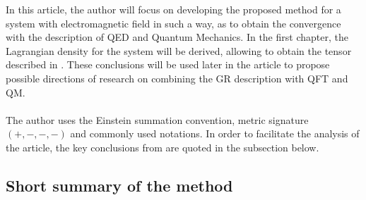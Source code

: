 \documentclass[aps,prx,preprint,groupedaddress,showkeys]{revtex4-2}
\begin{document}
In this article, the author will focus on developing the proposed method for a system with electromagnetic field in such a way, as to obtain the convergence with the description of QED and Quantum Mechanics. In the first chapter, the Lagrangian density for the system will be derived, allowing to obtain the tensor described in \cite{PMofC}. These conclusions will be used later in the article to propose possible directions of research on combining the GR description with QFT and QM.\\
~\\ 
The author uses the Einstein summation convention, metric signature $(+,-,-,-)$ and commonly used notations. In order to facilitate the analysis of the article, the key conclusions from \cite{PMofC} are quoted in the subsection below. 

\subsection{Short summary of the method} \label{ShortSummary}
\end{document}

